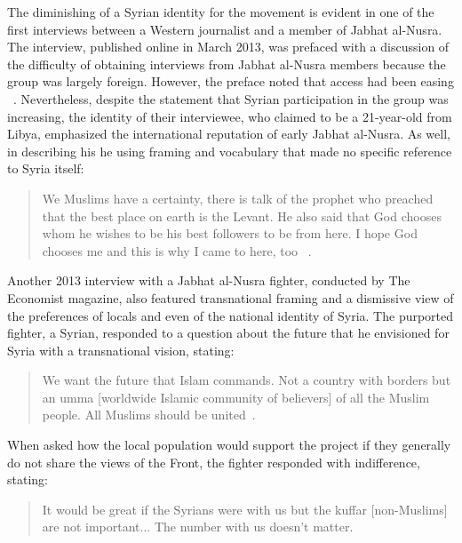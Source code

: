 The diminishing of a Syrian identity for the movement is evident in one of the first interviews between a Western journalist and a member of Jabhat al-Nusra. The interview,  published online in March 2013, was  prefaced with a discussion of the difficulty of obtaining interviews from Jabhat al-Nusra members because the group was largely foreign. However, the preface noted that access had been easing  ~\autocite{marrouch2013nusra}. Nevertheless, despite the statement that Syrian participation in the group was increasing, the identity of their interviewee, who claimed to be a 21-year-old from Libya, emphasized the international reputation of early Jabhat al-Nusra.  As well, in describing his  he using framing and vocabulary that made no specific reference to Syria itself:

\begin{quote}
We Muslims have a certainty, there is talk of the prophet who preached that the best place on earth is the Levant. He also said that God chooses whom he wishes to be his best followers to be from here. I hope God chooses me and this is why I came to here, too ~\autocite{marrouch2013nusra}.\end{quote} 
Another 2013 interview with a Jabhat al-Nusra fighter, conducted by The Economist magazine, also featured transnational framing and a dismissive view of the preferences of locals and even of the national identity of Syria. The purported fighter, a Syrian, responded to a question about the future that he envisioned for Syria with a transnational vision, stating:

\begin{quote}
We want the future that Islam commands. Not a country with borders but an umma [worldwide Islamic community of believers] of all the Muslim people. All Muslims should be united~\autocite{pom2013nusra}.\end{quote}

When asked how the local population would support the project if they generally do not share the views of the Front, the fighter responded with indifference, stating:

\begin{quote}It would be great if the Syrians were with us but the kuffar [non-Muslims] are not important... The number with us doesn't matter.\end{quote}~\autocite{pom2013nusra}

